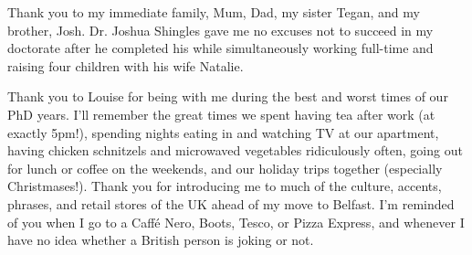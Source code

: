 Thank you to my immediate family, Mum, Dad, my sister Tegan, and my brother, Josh. Dr. Joshua Shingles gave me no excuses not to succeed in my doctorate after he completed his while simultaneously working full-time and raising four children with his wife Natalie.

Thank you to Louise for being with me during the best and worst times of our PhD years. I'll remember the great times we spent having tea after work (at exactly 5pm!), spending nights eating in and watching TV at our apartment, having chicken schnitzels and microwaved vegetables ridiculously often, going out for lunch or coffee on the weekends, and our holiday trips together (especially Christmases!). Thank you for introducing me to much of the culture, accents, phrases, and retail stores of the UK ahead of my move to Belfast. I'm reminded of you when I go to a Caff\'e Nero, Boots, Tesco, or Pizza Express, and whenever I have no idea whether a British person is joking or not.